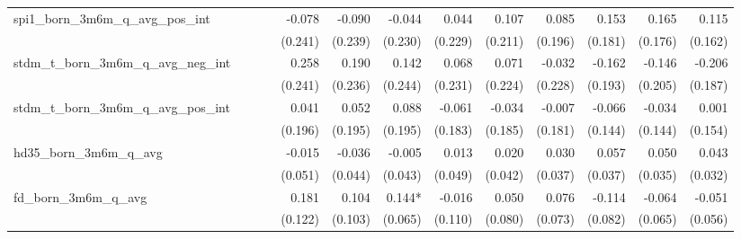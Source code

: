 \begin{tabular}{lrrrrrrrrrrrr}
spi1\_born\_3m6m\_q\_avg\_pos\_int          &              &              &              &       -0.078 &       -0.090 &       -0.044 &        0.044 &        0.107 &        0.085 &        0.153 &        0.165 &        0.115 \\ 
                                            &              &              &              &      (0.241) &      (0.239) &      (0.230) &      (0.229) &      (0.211) &      (0.196) &      (0.181) &      (0.176) &      (0.162) \\ 
stdm\_t\_born\_3m6m\_q\_avg\_neg\_int       &              &              &              &        0.258 &        0.190 &        0.142 &        0.068 &        0.071 &       -0.032 &       -0.162 &       -0.146 &       -0.206 \\ 
                                            &              &              &              &      (0.241) &      (0.236) &      (0.244) &      (0.231) &      (0.224) &      (0.228) &      (0.193) &      (0.205) &      (0.187) \\ 
stdm\_t\_born\_3m6m\_q\_avg\_pos\_int       &              &              &              &        0.041 &        0.052 &        0.088 &       -0.061 &       -0.034 &       -0.007 &       -0.066 &       -0.034 &        0.001 \\ 
                                            &              &              &              &      (0.196) &      (0.195) &      (0.195) &      (0.183) &      (0.185) &      (0.181) &      (0.144) &      (0.144) &      (0.154) \\ 
hd35\_born\_3m6m\_q\_avg                    &              &              &              &       -0.015 &       -0.036 &       -0.005 &        0.013 &        0.020 &        0.030 &        0.057 &        0.050 &        0.043 \\ 
                                            &              &              &              &      (0.051) &      (0.044) &      (0.043) &      (0.049) &      (0.042) &      (0.037) &      (0.037) &      (0.035) &      (0.032) \\ 
fd\_born\_3m6m\_q\_avg                      &              &              &              &        0.181 &        0.104 &       0.144* &       -0.016 &        0.050 &        0.076 &       -0.114 &       -0.064 &       -0.051 \\ 
                                            &              &              &              &      (0.122) &      (0.103) &      (0.065) &      (0.110) &      (0.080) &      (0.073) &      (0.082) &      (0.065) &      (0.056) \\ 

\end{tabular}
